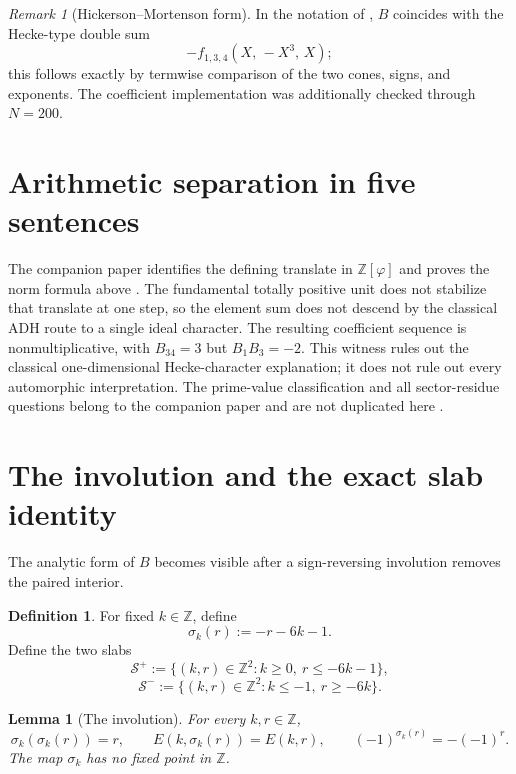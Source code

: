 \documentclass[12pt]{amsart}
\newtheorem{lemma}[theorem]{Lemma}
\theoremstyle{definition}
\newtheorem{definition}[theorem]{Definition}
\theoremstyle{remark}
\newtheorem{remark}[theorem]{Remark}
\newcommand{\ZZ}{\mathbb{Z}}
\newcommand{\ph}{\varphi}
\newcommand{\Splus}{\mathcal{S}^{+}}
\newcommand{\Sminus}{\mathcal{S}^{-}}
\begin{document}
\begin{remark}[Hickerson--Mortenson form]
In the notation of \cite{jHiMo14}, $B$ coincides with the
Hecke-type double sum
\[
  -f_{1,3,4}(X,\,-X^3,\,X);
\]
this follows exactly by termwise comparison of the two cones, signs,
and exponents.  The coefficient implementation was additionally
checked through $N=200$.
\end{remark}

\section{Arithmetic separation in five sentences}
\label{sec:arithmetic-recall}

The companion paper identifies the defining translate in
$\ZZ[\ph]$ and proves the norm formula above \cite{companion}.
The fundamental totally positive unit does not stabilize that translate
at one step, so the element sum does not descend by the classical ADH
route to a single ideal character.
The resulting coefficient sequence is nonmultiplicative, with
$B_{34}=3$ but $B_1B_3=-2$.
This witness rules out the classical one-dimensional Hecke-character
explanation; it does not rule out every automorphic interpretation.
The prime-value classification and all sector-residue questions belong
to the companion paper and are not duplicated here \cite{companion}.

\section{The involution and the exact slab identity}\label{sec:slab}

The analytic form of $B$ becomes visible after a sign-reversing
involution removes the paired interior.

\begin{definition}\label{def:sigma}
For fixed $k\in\ZZ$, define
\[
  \sigma_k(r):=-r-6k-1.
\]
Define the two slabs
\[
  \Splus:=\{(k,r)\in\ZZ^2:k\geq0,\ r\leq-6k-1\},
\]
\[
  \Sminus:=\{(k,r)\in\ZZ^2:k\leq-1,\ r\geq-6k\}.
\]
\end{definition}

\begin{lemma}[The involution]\label{lem:sigma}
For every $k,r\in\ZZ$,
\[
  \sigma_k(\sigma_k(r))=r,
  \qquad
  E(k,\sigma_k(r))=E(k,r),
  \qquad
  (-1)^{\sigma_k(r)}=-(-1)^r.
\]
The map $\sigma_k$ has no fixed point in $\ZZ$.
\end{lemma}
\end{document}
